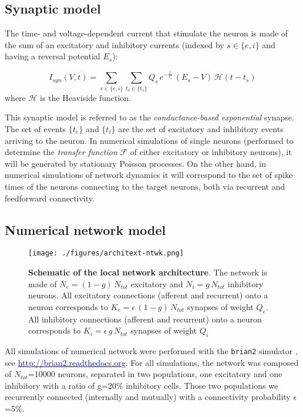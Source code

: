 \documentclass[8pt, colorlinks, a4paper]{article}
\renewcommand{\url}[1]{\underline{\textcolor{blue}{#1}}}
\begin{document}
\subsection{Synaptic model}
\label{sec-3-2}

The time- and voltage-dependent current that stimulate the neuron is
made of the sum of an excitatory and inhibitory currents (indexed by
\(s \in \{e,i\}\) and having a reversal potential \(E_s\)):

\begin{equation}
\label{eq:syn-current}
 I_{syn}(V,t) = \sum_{s \in \{e,i\}} \sum_{t_s \in \{t_s\}} Q_s \, e^{-\frac{t}{\tau_s}} \, (E_{s}-V) \, \mathcal{H}(t-t_s)
\end{equation}
where \(\mathcal{H}\) is the Heaviside function.

This synaptic model is referred to as the \emph{conductance-based
  exponential} synapse. The set of events \(\{t_e\}\) and \(\{t_i\}\)
are the set of excitatory and inhibitory events arriving to the
neuron. In numerical simulations of single neurons (performed to
determine the \textit{transfer function} \(\mathcal{F}\) of either
excitatory or inhibitory neurons), it will be generated by stationary
Poisson processes. On the other hand, in numerical simulations of
network dynamics it will correspond to the set of spike times of the
neurons connecting to the target neurons, both via recurrent and
feedforward connectivity.

\subsection{Numerical network model}
\label{sec-3-3}

\begin{figure}[tb!]
\centering
\texttt{[image: ./figures/architext-ntwk.png]}
\caption{\label{ntwk-architect}\textbf{Schematic of the local network architecture}. The network is made of \(N_e=(1-g) \, N_{tot}\) excitatory and \(N_i=g \, N_{tot}\) inhibitory neurons. All excitatory connections (afferent and recurrent) onto a neuron corresponds to \(K_e= \epsilon \, (1-g) \, N_{tot}\) synapses of weight \(Q_e\). All inhibitory connections (afferent and recurrent) onto a neuron corresponds to \(K_i= \epsilon \, g \, N_{tot}\) synapses of weight \(Q_i\)}
\end{figure}

All simulations of numerical network were performed with the \texttt{brian2}
simulator \cite{Goodman2009}, see \url{http://brian2.readthedocs.org}. For all
simulations, the network was composed of \(N_{tot}\)=10000 neurons,
separated in two populations, one excitatory and one inhibitory with a
ratio of g=20\% inhibitory cells. Those two populations we recurrently
connected (internally and mutually) with a connectivity probability
\(\epsilon\)=5\%.
\end{document}
